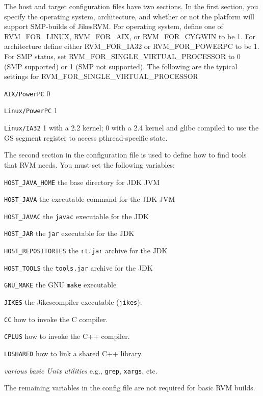 \begin{enumerate}
The host and target configuration files have two sections.  In the
first section, you specify the operating system, architecture, and
whether or not the platform will support SMP-builds of JikesRVM. 
For operating system, define one of RVM\_FOR\_LINUX, RVM\_FOR\_AIX, or
RVM\_FOR\_CYGWIN to be 1.  For architecture define either
RVM\_FOR\_IA32 or RVM\_FOR\_POWERPC to be 1.  For SMP status, set
RVM\_FOR\_SINGLE\_VIRTUAL\_PROCESSOR to 0 (SMP supported) or 1 (SMP not
supported).  The following are the typical settings for
RVM\_FOR\_SINGLE\_VIRTUAL\_PROCESSOR 
\begin{description}
\item {\tt AIX/PowerPC} 0 
\item {\tt Linux/PowerPC} 1 
\item {\tt Linux/IA32} 1 with a 2.2 kernel; 
0 with a 2.4 kernel and glibc compiled to use the GS
segment register to access pthread-specific state.
\end{description}                
The second section in the configuration file is used to define how to
find tools that RVM needs. You must set the following variables:
\begin{description}
\item {\tt HOST\_JAVA\_HOME} the base directory for JDK JVM
\item {\tt HOST\_JAVA} the executable command for the JDK JVM
\item {\tt HOST\_JAVAC} the {\tt javac} executable for the JDK  
\item {\tt HOST\_JAR} the {\tt jar} executable for the JDK  
\item {\tt HOST\_REPOSITORIES} the {\tt rt.jar} archive for the JDK  
\item {\tt HOST\_TOOLS} the {\tt tools.jar} archive for the JDK  
\item {\tt GNU\_MAKE} the GNU {\tt make} executable
\item {\tt JIKES} the Jikes\trademark compiler executable ({\tt jikes}).
\item {\tt CC} how to invoke the C compiler.
\item {\tt CPLUS} how to invoke the C++ compiler.
\item {\tt LDSHARED} how to link a shared C++ library.
\item {\em various basic Unix utilities} e.g., {\tt grep}, {\tt xargs}, etc.
\end{description}
The remaining variables in the config file are not required for basic RVM
builds.


\end{enumerate}
